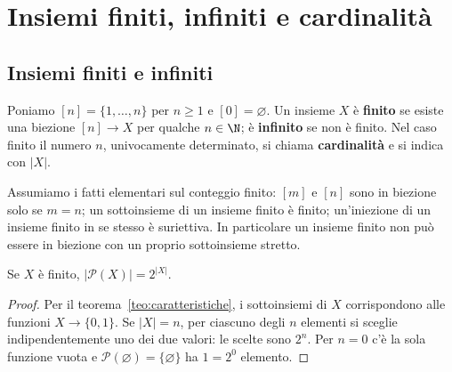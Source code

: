 \chapter{Insiemi finiti, infiniti e cardinalità}

\section{Insiemi finiti e infiniti}
\begin{definizione}
Poniamo $[n]=\{1,\ldots,n\}$ per $n\ge1$ e $[0]=\varnothing$. Un insieme $X$ è \textbf{finito} se esiste una biezione $[n]\to X$ per qualche $n\in\N$; è \textbf{infinito} se non è finito. Nel caso finito il numero $n$, univocamente determinato, si chiama \textbf{cardinalità} e si indica con $|X|$.
\end{definizione}

Assumiamo i fatti elementari sul conteggio finito: $[m]$ e $[n]$ sono in biezione solo se $m=n$; un sottoinsieme di un insieme finito è finito; un'iniezione di un insieme finito in se stesso è suriettiva. In particolare un insieme finito non può essere in biezione con un proprio sottoinsieme stretto.

\begin{corollario}
Se $X$ è finito, $|\mathcal P(X)|=2^{|X|}$.
\end{corollario}
\begin{proof}
Per il teorema~\ref{teo:caratteristiche}, i sottoinsiemi di $X$ corrispondono alle funzioni $X\to\{0,1\}$. Se $|X|=n$, per ciascuno degli $n$ elementi si sceglie indipendentemente uno dei due valori: le scelte sono $2^n$. Per $n=0$ c'è la sola funzione vuota e $\mathcal P(\varnothing)=\{\varnothing\}$ ha $1=2^0$ elemento.
\end{proof}

